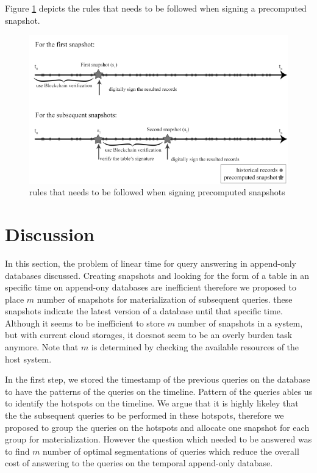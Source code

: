Figure \ref{fig:signing_snapshots} depicts the rules that needs to be followed when signing a precomputed snapshot.

\begin{figure}
	\centering
	\includegraphics[width=\textwidth]{figs/signing_snapshots.pdf}
	\caption{rules that needs to be followed when signing precomputed snapshots}
	\label{fig:signing_snapshots}
\end{figure}

\section{Discussion}
In this section, the problem of linear time for query answering in append-only databases discussed. Creating snapshots and looking for the form of a table in an specific time on append-ony databases are inefficient therefore we proposed to place $m$ number of snapshots for materialization of subsequent queries. these snapshots indicate the latest version of a database until that specific time. Although it seems to be inefficient to store $m$ number of snapshots in a system, but with current cloud storages, it doesnot seem to be an overly burden task anymore. Note that $m$ is determined by checking the available resources of the host system.

In the first step, we stored the timestamp of the previous queries on the database to have the patterns of the queries on the timeline. Pattern of the queries ables us to identify the hotspots on the timeline. We argue that it is highly likeley that the the subsequent queries to be performed in these hotspots, therefore we proposed to group the queries on the hotspots and allocate one snapshot for each group for materialization. However the question which needed to be answered was to find $m$ number of optimal segmentations of queries which reduce the overall cost of answering to the queries on the temporal append-only database.

